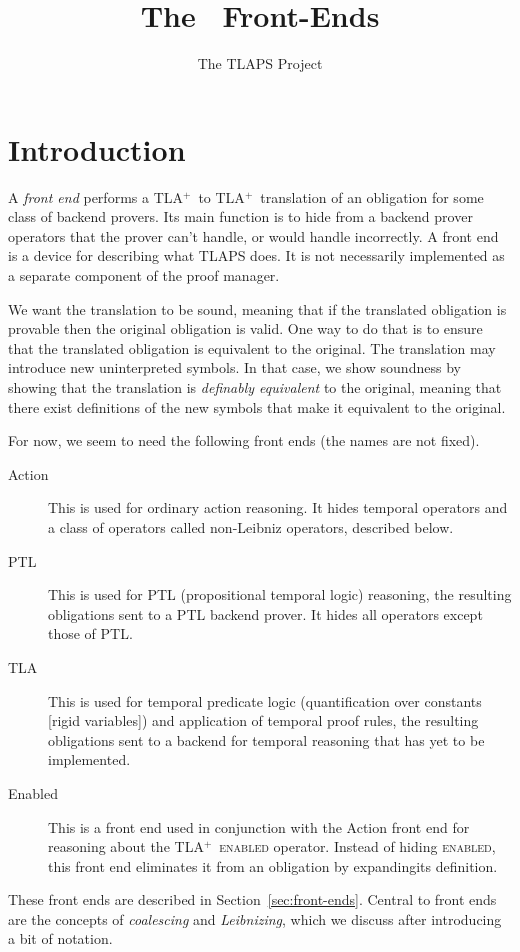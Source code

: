 \documentclass[11pt,fleqn]{article}
\title{\textbf{The \tlaplus\ Front-Ends}}
\author{The TLAPS Project}
\date{\moddate}
\newcommand{\tlaplus}{TLA$^{+}$}
\begin{document}
\maketitle

\section{Introduction}

A \emph{front end} performs a \tlaplus\ to \tlaplus\ translation of an
obligation for some class of backend provers.  Its main function is to
hide from a backend prover operators that the prover can't handle, or
would handle incorrectly.  A front end is a device for describing what
TLAPS does.  It is not necessarily implemented as a separate component
of the proof manager.

We want the translation to be sound, meaning that if the translated
obligation is provable then the original obligation is valid.  One way
to do that is to ensure that the translated obligation is equivalent
to the original.  The translation may introduce new uninterpreted
symbols.  In that case, we show soundness by showing that the
translation is \emph{definably equivalent} to the original, meaning
that there exist definitions of the new symbols that make it
equivalent to the original.

For now, we seem to need the following front ends (the names are not
fixed).
\begin{description}
\item[Action] This is used for ordinary action reasoning.  It hides
temporal operators and a class of operators called non-Leibniz
operators, described below.

\item[PTL] This is used for PTL (propositional temporal logic)
reasoning, the resulting obligations sent to a PTL backend prover.  It
hides all operators except those of PTL.

\item[TLA] This is used for temporal predicate logic (quantification
over constants [rigid variables]) and application of temporal proof
rules, the resulting obligations sent to a backend for temporal
reasoning that has yet to be implemented.

\item[Enabled] This is a front end used in conjunction with the Action
front end for reasoning about the \tlaplus\ \textsc{enabled} operator.
Instead of hiding \textsc{enabled}, this front end eliminates it from
an obligation by expandingits definition.

\end{description}
These front ends are described in Section~\ref{sec:front-ends}.
Central to front ends are the concepts of 
\emph{coalescing} and \emph{Leibnizing}, which we discuss after
introducing a bit of notation.
\end{document}

